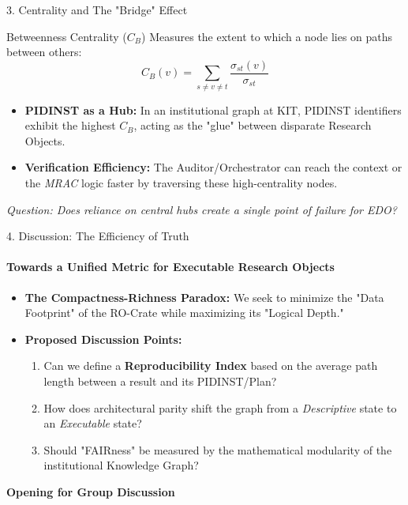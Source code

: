 \documentclass[aspectratio=169]{beamer}
\begin{document}
\begin{frame}{3. Centrality and The "Bridge" Effect}
    \begin{block}{Betweenness Centrality ($C_B$)}
        Measures the extent to which a node lies on paths between others:
        \[ C_B(v) = \sum_{s \neq v \neq t} \frac{\sigma_{st}(v)}{\sigma_{st}} \]
    \end{block}
    \begin{itemize}
        \item \textbf{PIDINST as a Hub:} In an institutional graph at KIT, PIDINST identifiers exhibit the highest $C_B$, acting as the "glue" between disparate Research Objects.
        \item \textbf{Verification Efficiency:} The Auditor/Orchestrator can reach the context or the \textit{MRAC} logic faster by traversing these high-centrality nodes.
    \end{itemize}
    \vfill
    \centering
    \textit{Question: Does reliance on central hubs create a single point of failure for EDO?}
\end{frame}

\begin{frame}{4. Discussion: The Efficiency of Truth}
    \framesubtitle{Towards a Unified Metric for Executable Research Objects}
    \begin{itemize}
        \item \textbf{The Compactness-Richness Paradox:} We seek to minimize the "Data Footprint" of the RO-Crate while maximizing its "Logical Depth."
        \item \textbf{Proposed Discussion Points:}
        \begin{enumerate}
            \item Can we define a \textbf{Reproducibility Index} based on the average path length between a result and its PIDINST/Plan?
            \item How does architectural parity shift the graph from a \textit{Descriptive} state to an \textit{Executable} state?
            \item Should "FAIRness" be measured by the mathematical modularity of the institutional Knowledge Graph?
        \end{enumerate}
    \end{itemize}
    \vfill
    \centering
    \textbf{Opening for Group Discussion}
\end{frame}
\end{document}
